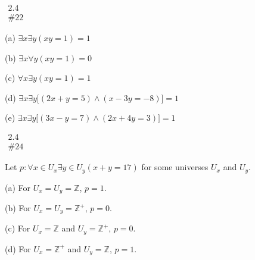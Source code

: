 \documentclass{article}
\newcommand{\T}{1}
\newcommand{\F}{0}
\newcommand{\problem}[2]{$\boxed{\begin{array}{l}\text{#1} \\ \text{\##2}\end{array}}$}
\newcommand{\subproblem}[1]{(#1)}
\begin{document}
\begin{multicols*}{2}
%

\problem{2.4}{22}

\subproblem{a} $\exists x\exists y(xy=1) = \boxed{\T}$

\subproblem{b} $\exists x\forall y(xy=1) = \boxed{\F}$

\subproblem{c} $\forall x\exists y(xy=1) = \boxed{\T}$

\subproblem{d} $\exists x\exists y\lbrack(2x+y=5)\wedge(x-3y=-8)\rbrack = \boxed{\T}$

\subproblem{e} $\exists x\exists y\lbrack(3x-y=7)\wedge(2x+4y=3)\rbrack = \boxed{\T}$

%

\problem{2.4}{24}

Let $p:\forall x\in U_x\exists y\in U_y(x+y=17)$ for some universes
$U_x$ and $U_y$.

\subproblem{a} For $U_x=U_y=\mathbb{Z}$, $p=\boxed{\T}$.

\subproblem{b} For $U_x=U_y=\mathbb{Z}^+$, $p=\boxed{\F}$.

\subproblem{c} For $U_x=\mathbb{Z}$ and $U_y=\mathbb{Z}^+$, $p=\boxed{\F}$.

\subproblem{d} For $U_x=\mathbb{Z}^+$ and $U_y=\mathbb{Z}$, $p=\boxed{\T}$.

\end{multicols*}
\end{document}
